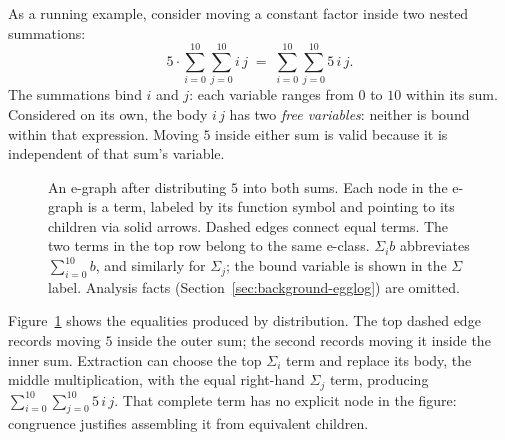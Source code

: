 As a running example, consider moving a constant factor inside two nested summations:
\begin{equation}
  5\cdot\sum_{i=0}^{10}\sum_{j=0}^{10} i\,j
  \;=\;\sum_{i=0}^{10}\sum_{j=0}^{10} 5\,i\,j.
  \label{eq:sum-example}
\end{equation}
The summations bind $i$ and $j$: each variable ranges from $0$ to $10$ within its sum.
Considered on its own, the body $i\,j$ has two \emph{free variables}:
  neither is bound within that expression.
Moving $5$ inside either sum is valid because it is independent of that sum's variable.

\begin{figure}[htbp]
  \centering
  
  \caption{An e-graph after distributing $5$ into both sums.
    Each node in the e-graph is a term, labeled by its function symbol
    and pointing to its children via solid arrows.
    Dashed edges connect equal terms.
    The two terms in the top row belong to the same e-class.
    $\Sigma_i b$ abbreviates $\sum_{i=0}^{10}b$, and similarly for $\Sigma_j$;
    the bound variable is shown in the $\Sigma$ label.
    Analysis facts (Section~\ref{sec:background-egglog}) are omitted.}
  \label{fig:background-egraph}
\end{figure}

Figure~\ref{fig:background-egraph} shows the equalities produced by distribution.
The top dashed edge records moving $5$ inside the outer sum;
  the second records moving it inside the inner sum.
Extraction can choose the top $\Sigma_i$ term and replace its body, the middle multiplication,
  with the equal right-hand $\Sigma_j$ term, producing $\sum_{i=0}^{10}\sum_{j=0}^{10}5\,i\,j$.
That complete term has no explicit node in the figure:
  congruence justifies assembling it from equivalent children.

